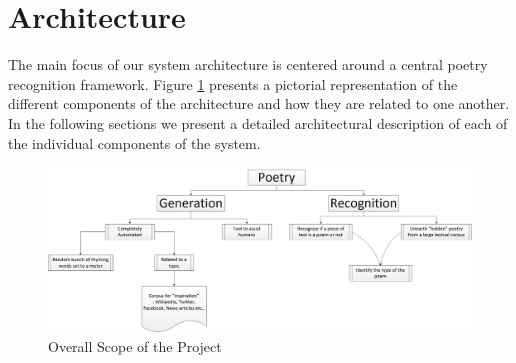 \documentclass[10pt, letter,twocolumn]{IEEEtran}
\begin{document}
\section{Architecture}
The main focus of our system architecture is centered around a central poetry recognition framework. Figure \ref{big_picture} presents a pictorial representation of the different components of the architecture and how they are related to one another.  In the following sections we present a detailed architectural description of each of the individual components of the system.

\begin{figure}[ht]
  \centering
    \includegraphics[scale=0.5]{Images/Big_Picture}
    \caption{Overall Scope of the Project}
  \label{big_picture}
\end{figure}
\end{document}

